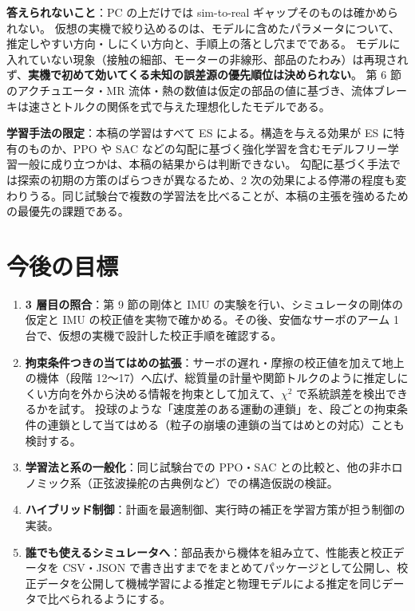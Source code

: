 \documentclass[paper=a4paper,fontsize=10pt,twocolumn,column_gap=2zw,line_length=24zw,number_of_lines=46,head_space=20mm]{jlreq}
\begin{document}
\textbf{答えられないこと}：PC の上だけでは sim-to-real ギャップそのものは確かめられない。
仮想の実機で絞り込めるのは、モデルに含めたパラメータについて、推定しやすい方向・しにくい方向と、手順上の落とし穴までである。
モデルに入れていない現象（接触の細部、モーターの非線形、部品のたわみ）は再現されず、\textbf{実機で初めて効いてくる未知の誤差源の優先順位は決められない}。
第 6 節のアクチュエータ・MR 流体・熱の数値は仮定の部品の値に基づき、流体ブレーキは速さとトルクの関係を式で与えた理想化したモデルである。

\textbf{学習手法の限定}：本稿の学習はすべて ES による。構造を与える効果が ES に特有のものか、PPO や SAC などの勾配に基づく強化学習を含むモデルフリー学習一般に成り立つかは、本稿の結果からは判断できない。
勾配に基づく手法では探索の初期の方策のばらつきが異なるため、2 次の効果による停滞の程度も変わりうる。同じ試験台で複数の学習法を比べることが、本稿の主張を強めるための最優先の課題である。


\section{今後の目標}

\begin{enumerate}\setlength{\itemsep}{0pt}
\item \textbf{3 層目の照合}：第 9 節の剛体と IMU の実験を行い、シミュレータの剛体の仮定と IMU の校正値を実物で確かめる。その後、安価なサーボのアーム 1 台で、仮想の実機で設計した校正手順を確認する。
\item \textbf{拘束条件つきの当てはめの拡張}：サーボの遅れ・摩擦の校正値を加えて地上の機体（段階 12〜17）へ広げ、総質量の計量や関節トルクのように推定しにくい方向を外から決める情報を拘束として加えて、$\chi^2$ で系統誤差を検出できるかを試す。
投球のような「速度差のある運動の連鎖」を、段ごとの拘束条件の連鎖として当てはめる（粒子の崩壊の連鎖の当てはめとの対応）ことも検討する。
\item \textbf{学習法と系の一般化}：同じ試験台での PPO・SAC との比較と、他の非ホロノミック系（正弦波操舵の古典例など）での構造仮説の検証。
\item \textbf{ハイブリッド制御}：計画を最適制御、実行時の補正を学習方策が担う制御の実装。
\item \textbf{誰でも使えるシミュレータへ}：部品表から機体を組み立て、性能表と校正データを CSV・JSON で書き出すまでをまとめてパッケージとして公開し、校正データを公開して機械学習による推定と物理モデルによる推定を同じデータで比べられるようにする。
\end{enumerate}
\end{document}
